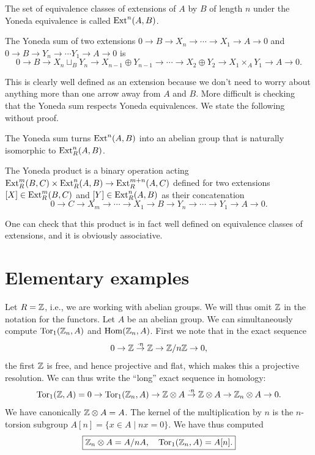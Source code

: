 \begin{defn}
    The set of equivalence classes of extensions of $A$ by $B$ of length $n$ under the Yoneda equivalence is called $\operatorname{Ext}^n(A,B)$.
\end{defn}

\begin{defn}
    The Yoneda sum of two extensions $0\to B\to X_n\to\cdots \to X_1\to A\to 0$ and $0\to B\to Y_n\to \cdots Y_1\to A\to 0$ is 
    \[0\to B\to X_n\sqcup_B Y_n\to X_{n-1}\oplus Y_{n-1}\to \cdots \to X_2\oplus Y_2\to X_1\times_A Y_1\to A\to 0.\]
\end{defn}

This is clearly well defined as an extension because we don't need to worry about anything more than one arrow away from $A$ and $B$. More difficult is checking that the Yoneda sum respects Yoneda equivalences. We state the following without proof.

\begin{thm}
    The Yoneda sum turns $\operatorname{Ext}^n(A,B)$ into an abelian group that is naturally isomorphic to $\operatorname{Ext}^n_R(A,B)$.
\end{thm}


\begin{defn}
    The Yoneda product is a binary operation acting $\operatorname{Ext}^m_R(B,C)\times \operatorname{Ext}^n_R(A,B)\to \operatorname{Ext}^{m+n}_R(A,C)$ defined for two extensions $[X]\in \operatorname{Ext}^m_R(B,C)$ and $[Y]\in \operatorname{Ext}^n_R(A,B)$ as their concatenation
    \[0\to C\to X_m\to \cdots \to X_1\to B\to Y_n\to \cdots\to Y_1\to A\to 0.\]
\end{defn}

One can check that this product is in fact well defined on equivalence classes of extensions, and it is obviously associative.


\section{Elementary examples}

Let $R=\mathbb{Z}$, i.e., we are working with abelian groups. We will thus omit $\mathbb{Z}$ in the notation for the functors. Let $A$ be an abelian group. We can simultaneously compute $\operatorname{Tor}_1(\mathbb{Z}_n,A)$ and $\operatorname{Hom}(\mathbb{Z}_n,A)$. First we note that in the exact sequence
\[0\to \mathbb{Z}\overset{\cdot n}{\to}\mathbb{Z}\to \mathbb{Z}\slash n\mathbb{Z} \to 0,\]
the first $\mathbb{Z}$ is free, and hence projective and flat, which makes this a projective resolution. We can thus write the ``long'' exact sequence in homology:
\[\operatorname{Tor}_1(\mathbb{Z},A)=0\to \operatorname{Tor}_1(\mathbb{Z}_n,A)\to \mathbb{Z}\otimes A\overset{\cdot n}{\to} \mathbb{Z}\otimes A\to \mathbb{Z}_n\otimes A\to 0.\]
We have canonically $\mathbb{Z}\otimes A=A$. The kernel of the multiplication by $n$ is the $n$-torsion subgroup $A[n]=\{x\in A\mid nx=0\}$. We have thus computed
\[\boxed{\mathbb{Z}_n\otimes A=A\slash nA,\quad \operatorname{Tor}_1(\mathbb{Z}_n,A)=A[n].}\]

